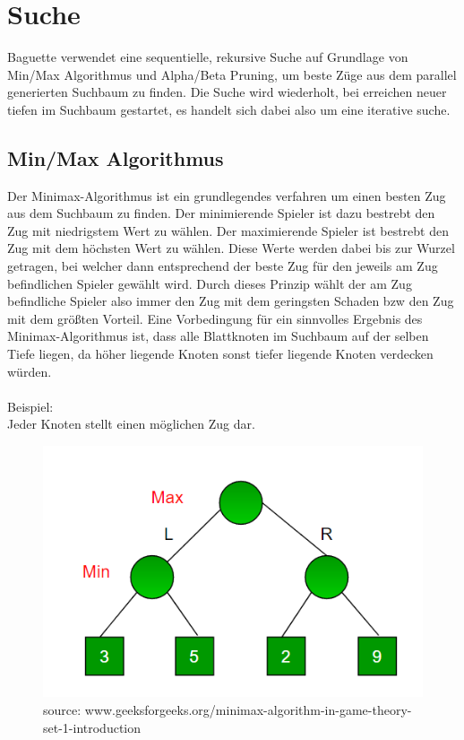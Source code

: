 \lstset{language=Java}
\section{Suche}\label{search}
Baguette verwendet eine sequentielle, rekursive Suche auf Grundlage von Min/Max Algorithmus und Alpha/Beta Pruning, um beste Züge aus dem parallel generierten Suchbaum zu finden.
Die Suche wird wiederholt, bei erreichen neuer tiefen im Suchbaum gestartet, es handelt sich dabei also um eine iterative suche.

\subsection{Min/Max Algorithmus}
Der Minimax-Algorithmus ist ein grundlegendes verfahren um einen besten Zug aus dem Suchbaum zu finden. Der minimierende Spieler ist dazu bestrebt den Zug mit niedrigstem Wert zu wählen. Der maximierende Spieler ist bestrebt den Zug mit dem höchsten Wert zu wählen.
Diese Werte werden dabei bis zur Wurzel getragen, bei welcher dann entsprechend der beste Zug für den jeweils am Zug befindlichen Spieler gewählt wird. Durch dieses Prinzip wählt der am Zug befindliche Spieler also immer den Zug mit dem geringsten Schaden bzw den Zug mit dem größten Vorteil. Eine Vorbedingung für ein sinnvolles Ergebnis des Minimax-Algorithmus ist, dass alle Blattknoten im Suchbaum auf der selben Tiefe liegen, da höher liegende Knoten sonst tiefer liegende Knoten verdecken würden.  
\\\\
Beispiel:\\Jeder Knoten stellt einen möglichen Zug dar.
\begin{figure}[h]
\begin{center}
\includegraphics[scale=0.5]{minmax.png}
\caption{source: www.geeksforgeeks.org/minimax-algorithm-in-game-theory-set-1-introduction}
\end{center}
\end{figure}

